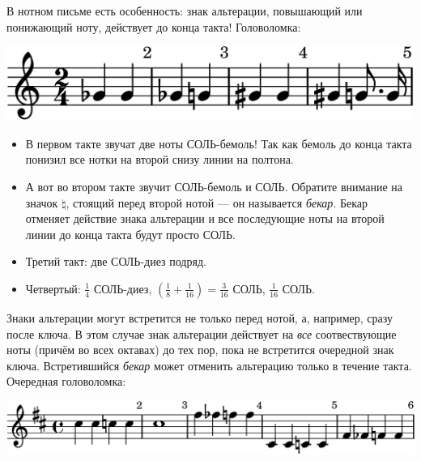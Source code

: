 В нотном письме есть особенность: знак альтерации, повышающий или понижающий ноту, действует до конца такта! Головоломка:
\begin{center}    
    \includegraphics{fig/notes/bekar}
\end{center}
\begin{itemize}
    \item В первом такте звучат две ноты СОЛЬ-бемоль! Так как бемоль до конца такта понизил все нотки на второй снизу линии на полтона.
    
    \item А вот во втором такте звучит СОЛЬ-бемоль и СОЛЬ. Обратите внимание на значок $\natural$, стоящий перед второй нотой --- он называется \emph{бекар}. Бекар отменяет действие знака альтерации и все последующие ноты на второй линии до конца такта будут просто СОЛЬ.
    
    \item Третий такт: две СОЛЬ-диез подряд.
    
    \item Четвертый: $\frac{1}{4}$ СОЛЬ-диез, $(\frac{1}{8} + \frac{1}{16}) = \frac{3}{16}$ СОЛЬ, $\frac{1}{16}$ СОЛЬ.
\end{itemize}

Знаки альтерации могут встретится не только перед нотой, а, например, сразу после ключа. В этом случае знак альтерации действует на \emph{все} соотвествующие ноты (причём во всех октавах) до тех пор, пока не встретится очередной знак ключа. Встретившийся \emph{бекар} может отменить альтерацию только в течение такта. Очередная головоломка:
\begin{center}    
    \includegraphics{fig/notes/tonality}
\end{center}

